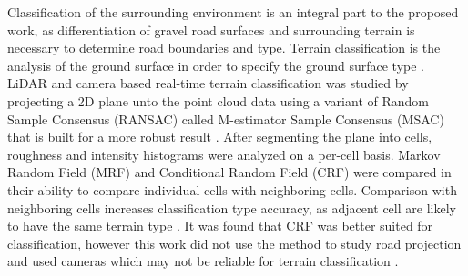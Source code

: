 \documentclass[journal,onecolumn]{IEEEtran}
\begin{document}
	{Classification of the surrounding environment is an integral part to the proposed work, as differentiation of gravel road surfaces and surrounding terrain is necessary to determine road boundaries and type. Terrain classification is the analysis of the ground surface in order to specify the ground surface type \cite{laible_3d_2012,laible_terrain_2013,laible_map_building,rasmussen_combining_2002,reymann_improving_2015,walas_terrain_2014,wietrzykowski_boosting_2014,wang_road_nodate}. LiDAR and camera based real-time terrain classification was studied by projecting a 2D plane unto the point cloud data using a variant of Random Sample Consensus (RANSAC) called M-estimator Sample Consensus (MSAC) \cite{mijakovska_generating_2014} that is built for a more robust result \cite{laible_3d_2012,laible_map_building,laible_terrain_2013}. After segmenting the plane into cells, roughness and intensity histograms were analyzed on a per-cell basis. Markov Random Field (MRF) \cite{chellappa_classification_1985} and Conditional Random Field (CRF) \cite{wallach_conditional_nodate} were compared in their ability to compare individual cells with neighboring cells. Comparison with neighboring cells increases classification type accuracy, as adjacent cell are likely to have the same terrain type \cite{haselich_terrain_2011,zhao_fusion_2014}. It was found that CRF was better suited for classification, however this work did not use the method to study road projection and used cameras which may not be reliable for terrain classification \cite{levi_3d_2012_light}.}
	
\end{document}
